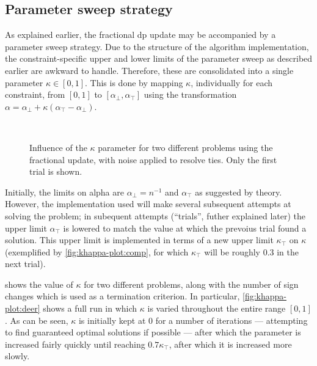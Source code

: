 \subsection{Parameter sweep strategy}
As explained earlier, the fractional \gls{dp} update may be accompanied by a parameter sweep strategy.
Due to the structure of the algorithm implementation, the constraint-specific upper and lower limits of the parameter sweep as described earlier are awkward to handle.
Therefore, these are consolidated into a single parameter \(\kappa\in\left[0,1\right]\).
This is done by mapping \(\kappa\), individually for each constraint, from \(\left[0,1\right]\) to \(\left[\alpha_\perp,\alpha_\top\right]\) using the transformation \(\alpha = \alpha_\perp + \kappa\left(\alpha_\top - \alpha_\perp\right)\).

\begin{figure}[p]
	\centering
	\\
	\caption{Influence of the \(\kappa\) parameter for two different problems using the fractional update, with noise applied to resolve ties. Only the first trial is shown.}
	\label{fig:khappa-plot}
\end{figure}

Initially, the limits on alpha are \(\alpha_\perp=n^{-1}\) and \(\alpha_\top\) as suggested by theory.
However, the implementation used will make several subsequent attempts at solving the problem; in subequent attempts (\enquote{trials}, futher explained later) the upper limit \(\alpha_\top\) is lowered to match the value at which the prevoius trial found a solution.
This upper limit is implemented in terms of a new upper limit \(\kappa_\top\) on \(\kappa\) (exemplified by \cref{fig:khappa-plot:comp}, for which \(\kappa_\top\) will be roughly \num{0.3} in the next trial).

 shows the value of \(\kappa\) for two different problems, along with the number of sign changes which is used as a termination criterion.
In particular, \cref{fig:khappa-plot:deer} shows a full run in which \(\kappa\) is varied throughout the entire range \([0,1]\).
As can be seen, \(\kappa\) is initially kept at 0 for a number of iterations --- attempting to find guaranteed optimal solutions if possible --- after which the parameter is increased fairly quickly until reaching \(0.7\kappa_\top\), after which it is increased more slowly.

